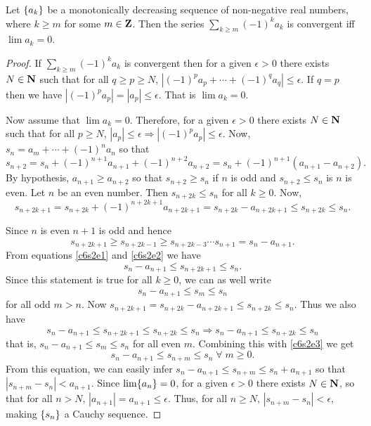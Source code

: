 \begin{prop}\label{c6s2p3}
Let $\{a_k\}$ be a monotonically decreasing sequence of non-negative 
real numbers, where $k \ge m$ for some $m \in \mathbf{Z}$. Then the series
$\sum_{k \ge m}(-1)^k a_k$ is convergent iff $\lim a_k = 0$.
\end{prop}
\begin{proof}
If $\sum_{k \ge m}(-1)^k a_k$ is convergent then for a given $\epsilon > 0$
there exists $N \in \mathbf{N}$ such that for all $q \ge p \ge N$, $|(-1)^pa_p
+ \cdots + (-1)^qa_q| \le \epsilon$. If $q = p$ then we have $|(-1)^p a_p|
= |a_p| \le \epsilon$. That is $\lim a_k = 0$.

Now assume that $\lim a_k = 0$. Therefore, for a given $\epsilon > 0$
there exists $N \in \mathbf{N}$ such that for all $p \ge N$, $|a_p| \le \epsilon
\Rightarrow |(-1)^p a_p| \le \epsilon$. Now, $s_n = a_m + \cdots + (-1)^n
a_n$ so that 
\[
s_{n+2} = s_n + (-1)^{n+1} a_{n+1} + (-1)^{n+2}a_{n + 2} =
s_n + (-1)^{n+1}(a_{n+1} - a_{n+2}).
\]
By hypothesis, $a_{n+1} \ge a_{n+2}$ so that $s_{n+2} \ge s_n$ if $n$ is
odd and $s_{n+2} \le s_n$ is $n$ is even. Let $n$ be an even number. Then
$s_{n + 2k} \le s_n$ for all $k \ge 0$. Now, 
\begin{equation}\label{c6s2e1}
s_{n + 2k + 1} = s_{n + 2k}
+ (-1)^{n + 2k + 1}a_{n + 2k + 1} = s_{n + 2k} - a_{n + 2k + 1} \le 
s_{n+2k} \le s_n.
\end{equation}

Since $n$ is even $n + 1$ is odd and hence 
\begin{equation}\label{c6s2e2}
s_{n + 2k + 1} \ge s_{n + 2k - 1} \ge s_{n + 2k - 3} \cdots s_{n+1} = 
s_n - a_{n+1}.
\end{equation}
From equations \eqref{c6s2e1} and \eqref{c6s2e2} we have
\[
s_n - a_{n+1} \le s_{n + 2k + 1} \le s_n.
\]
Since this statement is true for all $k \ge 0$, we can as well write
\begin{equation}\label{c6s2e3}
s_n - a_{n + 1} \le s_m \le s_n
\end{equation}
for all odd $m > n$. Now $s_{n + 2k + 1} = s_{n + 2k} - a_{n + 2k + 1}
\le s_{n + 2k} \le s_n$. Thus we also have
\[
s_n - a_{n+1} \le s_{n + 2k + 1} \le s_{n + 2k} \le s_n \Rightarrow
s_n - a_{n+1} \le s_{n + 2k} \le s_n 
\]
that is, $s_n - a_{n + 1} \le s_m \le s_n$ for all even $m$. Combining
this with \eqref{c6s2e3} we get
\begin{equation}\label{c6s2e4}
s_n - a_{n + 1} \le s_{n + m} \le s_n \;\forall\; m \ge 0.
\end{equation}
From this equation, we can easily infer $s_n - a_{n + 1} \le s_{n + m} \le
s_n + a_{n + 1}$ so that $|s_{n+m} - s_n| < a_{n + 1}$. Since 
$\lim\{a_n\} = 0$, for a given $\epsilon > 0$ there exists $N \in \mathbf{N}$,
so that for all $n > N$, $|a_{n+1}| = a_{n+1} \le \epsilon$. Thus, for all
$n \ge N$, $|s_{n + m} - s_n| < \epsilon$, making $\{s_n\}$ a Cauchy
sequence.
\end{proof}
